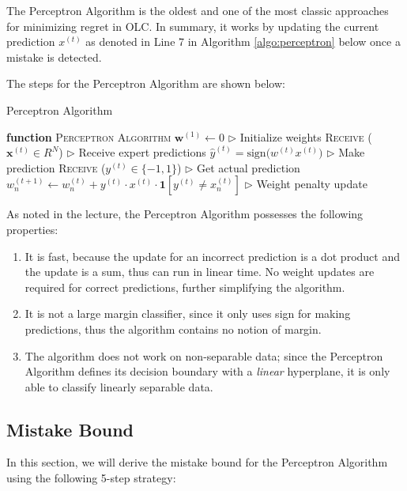 \documentclass[11pt]{article}
\begin{document}
The Perceptron Algorithm is the oldest and one of the most classic approaches for minimizing regret in OLC. In summary, it works by updating the current prediction $x^{(t)}$ as denoted in Line 7 in Algorithm \ref{algo:perceptron} below once a mistake is detected. 

The steps for the Perceptron Algorithm are shown below: 

\begin{algorithm}[H]
\caption{Perceptron Algorithm}
\label{algo:perceptron}
\begin{algorithmic}[1]
\STATE \textbf{function} \textsc{Perceptron Algorithm}
\STATE $\textbf{w}^{(1)} \leftarrow 0$ \hfill $\triangleright$ Initialize weights
\STATE \textsc{Receive} ($\textbf{x}^{(t)}\in R^N$) \hfill $\triangleright$ Receive expert predictions
\STATE $\hat{y}^{(t)} = \text{sign}\Big(w^{(t)} x^{(t)}\Big)$ \hfill $\triangleright$ Make prediction
\STATE \textsc{Receive} ($y^{(t)}\in\{-1, 1\}$) \hfill $\triangleright$ Get actual prediction
\STATE $w_n^{(t+1)}\leftarrow w_n^{(t)} + y^{(t)} \cdot x^{(t)} \cdot\textbf{1}[y^{(t)}\neq x_n^{(t)}] $ \hfill $\triangleright$ Weight penalty update
\ENDFOR
\end{algorithmic}
\end{algorithm}

As noted in the lecture, the Perceptron Algorithm possesses the following properties: 

\begin{enumerate}
    \item It is fast, because the update for an incorrect prediction is a dot product and the update is a sum, thus can run in linear time. No weight updates are required for correct predictions, further simplifying the algorithm.
    \item It is not a large margin classifier, since it only uses sign for making predictions, thus the algorithm contains no notion of margin.
    \item The algorithm does not work on non-separable data; since the Perceptron Algorithm defines its decision boundary with a \textit{linear} hyperplane, it is only able to classify linearly separable data. 
\end{enumerate}

\subsection{Mistake Bound}

In this section, we will derive the mistake bound for the Perceptron Algorithm using the following 5-step strategy:
\end{document}
